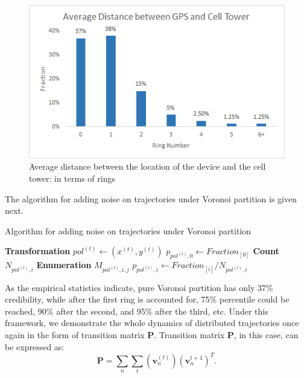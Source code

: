 \documentclass[12pt]{article}
\theoremstyle{definition}
\begin{document}
\begin{figure}
  \centering
  \includegraphics[width=12cm]{ring_distance.jpg}
  \caption{Average distance between the location of the device and the cell tower: in terms of rings \cite{closest_antenna_fallacy_2021}}
  \label{fig:ring_distance}
\end{figure}

The algorithm for adding noise on trajectories under Voronoi partition is given next.


\begin{algorithm}
  \caption{Algorithm for adding noise on trajectories under Voronoi partition}
  \label{alg:ring-noise}
  \begin{algorithmic}
    \State \textbf{Transformation} \(pol^{(t)} \gets (x^{(t)},y^{(t)})\) 
    \State \(p_{pol^{(t)},0} \gets Fraction_{[0]}\) 
    \State \textbf{Count} \(N_{pol^{(t)},i}\) 
    \State \textbf{Enumeration} \(M_{pol^{(t)},i,j}\) 
    \State {}
    \State \(p_{pol^{(t)},i} \gets Fraction_{[i]}/N_{pol^{(t)},i}\) 
    \EndFor
    \EndProcedure
  \end{algorithmic}
\end{algorithm}


As the empirical statistics indicate, pure Voronoi partition has only 37\% credibility, while after the first ring is accounted for, 75\% percentile could be reached, 90\% after the second, and 95\% after the third, etc. Under this framework, we demonstrate the whole dynamics of distributed trajectories once again in the form of transition matrix \textbf{P}. Transition matrix \textbf{P}, in this case, can be expressed as:
\begin{equation*}
    \textbf{P}=\sum_{n}\sum_{t}(\boldsymbol{v}_{n}^{(t)})(\boldsymbol{v}_{n}^{t+1})^{T}.
\end{equation*}
\end{document}
